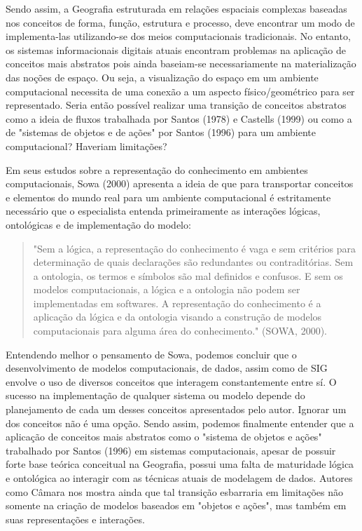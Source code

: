 Sendo assim, a Geografia estruturada em relações espaciais complexas baseadas nos conceitos de forma, função, estrutura e processo, deve encontrar um modo de implementa-las utilizando-se dos meios computacionais tradicionais. No entanto, os sistemas informacionais digitais atuais encontram problemas na aplicação de conceitos mais abstratos pois ainda baseiam-se necessariamente na materialização das noções de espaço. Ou seja, a visualização do espaço em um ambiente computacional necessita de uma conexão a um aspecto físico/geométrico para ser representado. Seria então possível realizar uma transição de conceitos abstratos como a ideia de fluxos trabalhada por Santos (1978)\cite{SANTOS} e Castells (1999)\cite{CASTELLS} ou como a de "sistemas de objetos e de ações" por Santos (1996)\cite{SANTOS_96} para um ambiente computacional? Haveriam limitações?

Em seus estudos sobre a representação do conhecimento em ambientes computacionais, Sowa (2000)\cite{SOWA} apresenta a ideia de que para transportar conceitos e elementos do mundo real para um ambiente computacional é estritamente necessário que o especialista entenda primeiramente as interações lógicas, ontológicas e de implementação do modelo:

	\begin{quote}
		"Sem a lógica, a representação do conhecimento é vaga e sem critérios para determinação de quais declarações são redundantes ou contraditórias. Sem a ontologia, os termos e símbolos são mal definidos e confusos. E sem os modelos computacionais, a lógica e a ontologia não podem ser implementadas em softwares. A representação do conhecimento é a aplicação da lógica e da ontologia visando a construção de modelos computacionais para alguma área do conhecimento." (SOWA, 2000)\cite{SOWA}.
	\end{quote}

Entendendo melhor o pensamento de Sowa, podemos concluir que o desenvolvimento de modelos computacionais, de dados, assim como de SIG envolve o uso de diversos conceitos que interagem constantemente entre sí. O sucesso na implementação de qualquer sistema ou modelo depende do planejamento de cada um desses conceitos apresentados pelo autor. Ignorar um dos conceitos não é uma opção. Sendo assim, podemos finalmente entender que a aplicação de conceitos mais abstratos como o "sistema de objetos e ações" trabalhado por Santos (1996)\cite{SANTOS_96}  em sistemas computacionais, apesar de possuir forte base teórica conceitual na Geografia, possui uma falta de maturidade lógica e ontológica ao interagir com as técnicas atuais de modelagem de dados. Autores como Câmara nos mostra ainda que tal transição esbarraria em limitações não somente na criação de modelos baseados em "objetos e ações", mas também em suas representações e interações.

